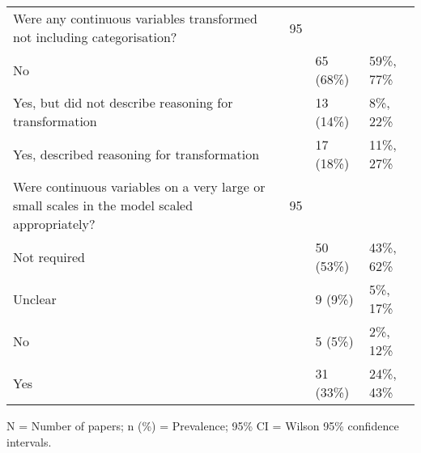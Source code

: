 \begin{table}[H]
\begin{widestuff}
\begin{flushleft}
\begin{tabular}{p{9cm}lll}
  Were any continuous variables transformed not including categorisation? & 95 &  &  \\ 
  No &  & 65 (68\%) & 59\%, 77\% \\ 
  Yes, but did not describe reasoning for transformation &  & 13 (14\%) &  8\%, 22\% \\ 
  Yes, described reasoning for transformation &  & 17 (18\%) & 11\%, 27\% \\ 
  Were continuous variables on a very large or small scales in the model scaled appropriately? & 95 &  &  \\ 
  Not required &  & 50 (53\%) & 43\%, 62\% \\ 
  Unclear &  & 9 (9\%) &  5\%, 17\% \\ 
  No &  & 5 (5\%) &  2\%, 12\% \\ 
  Yes &  & 31 (33\%) & 24\%, 43\% \\ 
   \bottomrule
\end{tabular} \end{flushleft} \begin{flushleft} N = Number of papers; n (\%) = Prevalence;  95\% CI  =	Wilson 95\% confidence intervals. \end{flushleft}
\end{widestuff}
\end{table}

